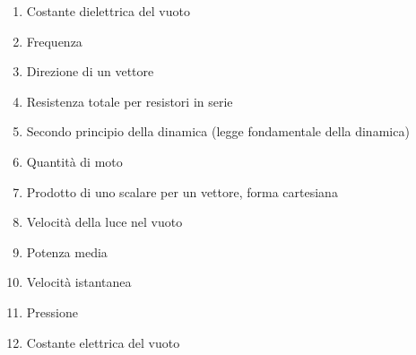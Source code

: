 \documentclass[a4paper,11pt,italian]{article}
\begin{document}
\begin{enumerate}
\item Costante dielettrica del vuoto
\item Frequenza 
\item Direzione di un vettore 
\item Resistenza totale per resistori in serie
\item Secondo principio della dinamica (legge fondamentale della dinamica)
\item Quantità di moto
\item Prodotto di uno scalare per un vettore, forma cartesiana
\item Velocità della luce nel vuoto
\item Potenza media
\item Velocità istantanea
\item Pressione
\item Costante elettrica del vuoto
\end{enumerate}
\end{document}
